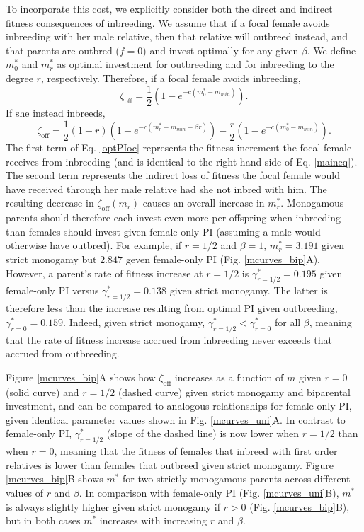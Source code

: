 \documentclass[10pt,letterpaper]{article}
\begin{document}
To incorporate this cost, we explicitly consider both the direct and indirect fitness consequences of inbreeding. We assume that if a focal female avoids inbreeding with her male relative, then that relative will outbreed instead, and that parents are outbred ($f=0$) and invest optimally for any given $\beta$. We define $m^{*}_{0}$ and $m^{*}_{r}$ as optimal investment for outbreeding and for inbreeding to the degree $r$, respectively. Therefore, if a focal female avoids inbreeding,
\begin{equation} \label{optPI}
\zeta_{\textrm{off}} = \frac{1}{2}\left(1-e^{-c\left(m^{*}_{0}-m_{min}\right)}\right).
\end{equation}
If she instead inbreeds,
\begin{equation} \label{optPIoc}
\zeta_{\textrm{off}} = \frac{1}{2}\left(1+r\right)\left(1-e^{-c\left(m^{*}_{r}-m_{min}-\beta r\right)}\right) - \frac{r}{2}\left(1-e^{-c\left(m^{*}_{0}-m_{min}\right)}\right).
\end{equation} 
The first term of Eq. \ref{optPIoc} represents the fitness increment the focal female receives from inbreeding (and is identical to the right-hand side of Eq. \ref{maineq}). The second term represents the indirect loss of fitness the focal female would have received through her male relative had she not inbred with him. The resulting decrease in $\zeta_{\textrm{off}}(m_{r})$ causes an overall increase in $m^{*}_{r}$. Monogamous parents should therefore each invest even more per offspring when inbreeding than females should invest given female-only PI (assuming a male would otherwise have outbred). For example, if $r=1/2$ and $\beta=1$, $m^{*}_{r}= 3.191$ given strict monogamy but $2.847$ geven female-only PI (Fig. \ref{mcurves_bip}A).  However, a parent's rate of fitness increase at $r=1/2$ is $\gamma^{*}_{r=1/2}=0.195$ given female-only PI versus $\gamma^{*}_{r=1/2}=0.138$ given strict monogamy. The latter is therefore less than the increase resulting from optimal PI given outbreeding, $\gamma^{*}_{r=0}=0.159$. Indeed, given strict monogamy, $\gamma^{*}_{r=1/2} < \gamma^{*}_{r=0}$ for all $\beta$, meaning that the rate of fitness increase accrued from inbreeding never exceeds that accrued from outbreeding. 

Figure \ref{mcurves_bip}A shows how $\zeta_{\textrm{off}}$ increases as a function of $m$ given $r=0$ (solid curve) and $r=1/2$ (dashed curve) given strict monogamy and biparental investment, and can be compared to analogous relationships for female-only PI, given identical parameter values shown in Fig. \ref{mcurves_uni}A. In contrast to female-only PI, $\gamma^{*}_{r=1/2}$ (slope of the dashed line) is now lower when $r=1/2$ than when $r=0$, meaning that the fitness of females that inbreed with first order relatives is lower than females that outbreed given strict monogamy. Figure \ref{mcurves_bip}B shows $m^{*}$ for two strictly monogamous parents across different values of $r$ and $\beta$. In comparison with female-only PI (Fig. \ref{mcurves_uni}B), $m^{*}$ is always slightly higher given strict monogamy if $r>0$ (Fig. \ref{mcurves_bip}B), but in both cases $m^{*}$ increases with increasing $r$ and $\beta$. 
\end{document}
